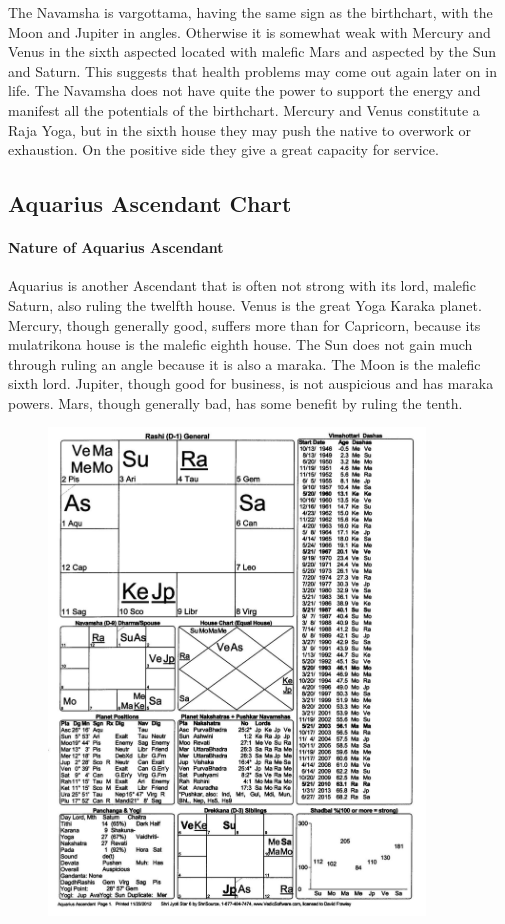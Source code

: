  

The Navamsha is vargottama, having the same sign as the birthchart, with the Moon and Jupiter in angles. Otherwise it is somewhat weak with Mercury and Venus in the sixth aspected located with malefic Mars and aspected by the Sun and Saturn. This suggests that health problems may come out again later on in life. The Navamsha does not have quite the power to support the energy and manifest all the potentials of the birthchart. Mercury and Venus constitute a Raja Yoga, but in the sixth house they may push the native to overwork or exhaustion. On the positive side they give a great capacity for service.

 

\subsection{Aquarius Ascendant Chart}
 

\paragraph{Nature of Aquarius Ascendant}

 

Aquarius is another Ascendant that is often not strong with its lord, malefic Saturn, also ruling the twelfth house. Venus is the great Yoga Karaka planet. Mercury, though generally good, suffers more than for Capricorn, because its mulatrikona house is the malefic eighth house. The Sun does not gain much through ruling an angle because it is also a maraka. The Moon is the malefic sixth lord. Jupiter, though good for business, is not auspicious and has maraka powers. Mars, though generally bad, has some benefit by ruling the tenth.

 

 \begin{figure}[h]
\centering
\includegraphics[width=10cm]{pics/Aquarius-Ascendant.jpg}
\caption{}
\end{figure}
 



